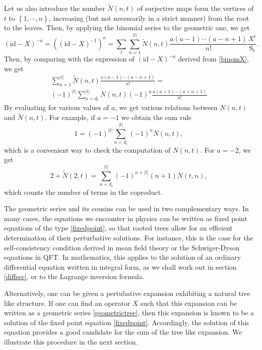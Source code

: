 \documentclass[12pt,here,feynmf]{article}
\begin{document}
Let us also introduce   the number $\widetilde{N}(n,t)$ of surjective maps form the vertices of $t$ to $\left\{1,\cdots,n\right\}$, increasing (but not necessarily in a strict manner) from the root to the leaves.
Then, by applying the binomial series to the geometric one, we get
\begin{equation}
(\mathrm{id}-X)^{-a}=\left((\mathrm{id}-X)^{-1}\right)^{a}=\sum_{t}
\sum_{n=1}^{|t|}\widetilde{N}(n,t)\frac{a(a-1)\cdots (a-n+1)}{n!}
\frac{X^{t}}{\mathrm{S}_{t}}.
\end{equation}
Then, by comparing with the expression of $(\mathrm{id}-X)^{-a}$ derived from \eqref{binomX}, we get
\begin{multline}
\sum_{n=1}^{|t|}\widetilde{N}(n,t)\frac{a(a-1)\cdots (a-n+1)}{n!}=\\
(-1)^{|t|}\sum_{n=d_{t}}^{|t|}N(n,t)(-1)^{n}\frac{a(a+1)\cdots (a+n+1)}{n!}
\end{multline}
By evaluating for various values of $a$, we get various relations between $N(n,t)$ and $\tilde{N}(n,t)$. For example, if $a=-1$ we obtain the sum rule
\begin{equation}
1=(-1)^{|t|}\sum_{n=d_{t}}^{|t|}(-1)^{n}N(n,t),
\end{equation}
which is a convenient way to check the computation of $N(n,t)$. For $a=-2$, we get
\begin{equation}
2+\widetilde{N}(2,t)=\sum_{n=d_{t}}^{|t|}(-1)^{n+|t|}(n+1)N(t,n),
\end{equation}  
which counts  the number of terms in the coproduct.


The geometric series and its cousins  can be used in two complementary ways. In many cases, the equations we encounter in physics can be written as fixed point equations of the type \eqref{fixedpoint}, so that rooted trees allow for an efficient determination of their perturbative solutions. For instance, this is the case for the self-consistency condition derived in mean field theory or the Schwiger-Dyson equations in QFT. In mathematics, this applies to the solution of an ordinary differential equation written in integral form, as we shall work out in section \ref{diffsec}, or to the Lagrange inversion formula.

Alternatively, one can be given a pertubative expansion exhibiting a natural tree like structure.  If one can find an operator $X$ such that this expansion can be written as a geometric series \eqref{geometrictree}, then this expansion is known to be a solution of the fixed point equation \eqref{fixedpoint}. Accordingly, the solution of this equation provides a good candidate for the sum of the tree like expansion.  We illustrate this procedure in the next section.
\end{document}

